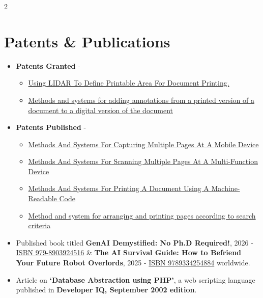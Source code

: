 \documentclass[a4paper,11pt]{article}
\begin{document}
\begin{multicols}{2}

\section*{Patents \& Publications}

\begin{itemize}
  \setlength\itemsep{-0.5em}

\item
  \textbf{Patents Granted} -
  \begin{itemize}
  \item \href{https://patents.justia.com/patent/12086483}{Using LIDAR To
    Define Printable Area For Document Printing.}
  \item \href{https://patents.justia.com/patent/12236185}{Methods
    and systems for adding annotations from a printed version of a
    document to a digital version of the document}
  \end{itemize}
\item \textbf{Patents Published} -
  \begin{itemize}
  \item \href{https://patents.justia.com/patent/20260143079}{Methods
    And Systems For Capturing Multiple Pages At A Mobile Device}
  \item \href{https://patents.justia.com/patent/20260143073}{Methods
    And Systems For Scanning Multiple Pages At A Multi-Function
    Device}
  \item \href{https://patents.justia.com/patent/20250244933}{Methods
    And Systems For Printing A Document Using A Machine-Readable Code}
  \item \href{https://patents.google.com/patent/US20190294385A1}{Method and
    system for arranging and printing pages according to search
    criteria}
  \end{itemize}

\item Published book titled \textbf{GenAI Demystified: No Ph.D
  Required!}, 2026 - \href{https://www.amazon.in/dp/B0GVPPDSQ5}{ISBN
  979-8903924516} \& \textbf{The AI Survival Guide: How to Befriend
  Your Future Robot Overlords}, 2025 -
  \href{https://www.amazon.in/dp/9334254882}{ISBN 9789334254884}
  worldwide.
  
\item Article on \textbf{`Database Abstraction using PHP'}, a web scripting
  language published in \textbf{Developer IQ, September 2002 edition}.


\end{itemize}
\end{multicols}
\end{document}
